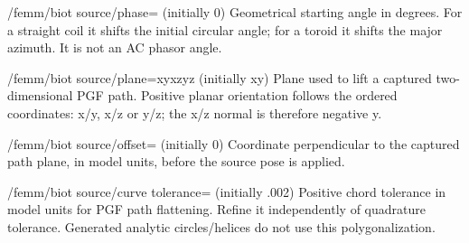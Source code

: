 \begin{key}{/femm/biot source/phase= (initially 0)}
Geometrical starting angle in degrees. For a straight coil it shifts the initial circular angle; for a toroid it shifts the major azimuth. It is not an AC phasor angle.
\end{key}
\begin{key}{/femm/biot source/plane=xy\textbar xz\textbar yz (initially xy)}
Plane used to lift a captured two-dimensional PGF path. Positive planar orientation follows the ordered coordinates: x/y, x/z or y/z; the x/z normal is therefore negative y.
\end{key}
\begin{key}{/femm/biot source/offset= (initially 0)}
Coordinate perpendicular to the captured path plane, in model units, before the source pose is applied.
\end{key}
\begin{key}{/femm/biot source/curve tolerance= (initially .002)}
Positive chord tolerance in model units for PGF path flattening. Refine it independently of quadrature tolerance. Generated analytic circles/helices do not use this polygonalization.
\end{key}

